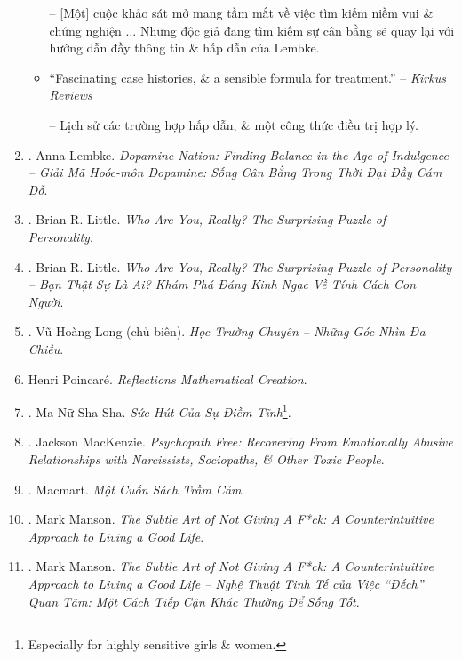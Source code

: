\documentclass{article}
\begin{document}
\begin{enumerate}
\begin{itemize}
		-- [Một] cuộc khảo sát mở mang tầm mắt về việc tìm kiếm niềm vui \& chứng nghiện $\ldots$ Những độc giả đang tìm kiếm sự cân bằng sẽ quay lại với hướng dẫn đầy thông tin \& hấp dẫn của Lembke.
		\item ``Fascinating case histories, \& a sensible formula for treatment.'' -- {\it Kirkus Reviews}
		
		-- Lịch sử các trường hợp hấp dẫn, \& một công thức điều trị hợp lý.
	\end{itemize}
	
	\item \cite{Lembke_dopamine_VN}. {\sc Anna Lembke}. {\it Dopamine Nation: Finding Balance in the Age of Indulgence -- Giải Mã Hoóc-môn Dopamine: Sống Cân Bằng Trong Thời Đại Đầy Cám Dỗ}.\hfill{\sf[done]}
	
	\item \cite{Little_personality}. {\sc Brian R. Little}. {\it Who Are You, Really? The Surprising Puzzle of Personality}.\hfill{\sf[done]}
	
	\item \cite{Little_personality_VN}. {\sc Brian R. Little}. {\it Who Are You, Really? The Surprising Puzzle of Personality -- Bạn Thật Sự Là Ai? Khám Phá Đáng Kinh Ngạc Về Tính Cách Con Người}.\hfill{\sf[done]}
	
	\item \cite{Long2021}. Vũ Hoàng Long (chủ biên). {\it Học Trường Chuyên -- Những Góc Nhìn Đa Chiều}.\hfill{\sf[done]}
	
	\item {\sc Henri Poincar\'e}. {\it Reflections Mathematical Creation}.\hfill{\sf[done]}
	
	\item \cite{MNSS_calm}. Ma Nữ Sha Sha. {\it Sức Hút Của Sự Điềm Tĩnh}\footnote{Especially for highly sensitive girls \& women.}.\hfill{\sf[done]}
	
	\item \cite{MacKenzie2015}. Jackson MacKenzie. {\it Psychopath Free: Recovering From Emotionally Abusive Relationships with Narcissists, Sociopaths, \& Other Toxic People}.\hfill{\sf[done]}
	\item \cite{Macmart_depress}. Macmart. {\it Một Cuốn Sách Trầm Cảm}.\hfill{\sf[reading]}
	
	\item \cite{Manson_giving_fuck}. Mark Manson. {\it The Subtle Art of Not Giving A F*ck: A Counterintuitive Approach to Living a Good Life}.\hfill{\sf[reading]}
	
	\item \cite{Manson_giving_fuck_vn}. Mark Manson. {\it The Subtle Art of Not Giving A F*ck: A Counterintuitive Approach to Living a Good Life -- Nghệ Thuật Tinh Tế của Việc ``Đếch'' Quan Tâm: Một Cách Tiếp Cận Khác Thường Để Sống Tốt}.\hfill{\sf[done]}
	

\end{enumerate}
\end{document}
